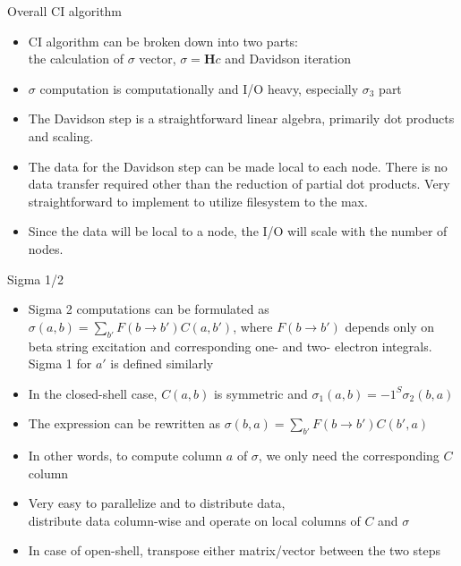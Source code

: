 \documentclass{beamer}
\begin{document}
\begin{frame}{Overall CI algorithm}
\begin{itemize}
\item CI algorithm can be broken down into two parts:  \\
  the calculation of $\sigma$ vector, $\sigma = \mathbf{H} c$ and Davidson iteration
\item $\sigma$ computation is computationally and I/O heavy, especially $\sigma_3$ part
\item The Davidson step is a straightforward linear algebra, primarily dot products and scaling.
\item The data for the Davidson step can be made local to each node.  There is no data transfer required other than the reduction of partial dot products. 
  Very straightforward to implement to utilize filesystem to the max.
\item Since the data will be local to a node, the I/O will scale with the number of nodes.
\end{itemize}
\end{frame}

\begin{frame}{Sigma 1/2}
\begin{itemize}
\item Sigma 2 computations can be formulated as
  $\sigma(a,b) = \sum_{b'} F(b \rightarrow b') C(a,b')$, where $F(b \rightarrow b')$
  depends only on beta string excitation and corresponding one- and two- electron integrals.
  Sigma 1 for $a'$ is defined similarly
\item In the closed-shell case, $C(a,b)$ is symmetric and $\sigma_1(a,b) = -1^{S} \sigma_2(b,a)$
\item The expression can be rewritten as $\sigma(b,a) = \sum_{b'} F(b \rightarrow b') C(b',a)$
\item In other words, to compute column $a$ of $\sigma$, we only need the corresponding $C$ column
\item Very easy to parallelize and to distribute data, \\
  distribute data column-wise and operate on local columns of $C$ and $\sigma$
\item In case of open-shell, transpose either matrix/vector between the two steps
\end{itemize}
\end{frame}
\end{document}
